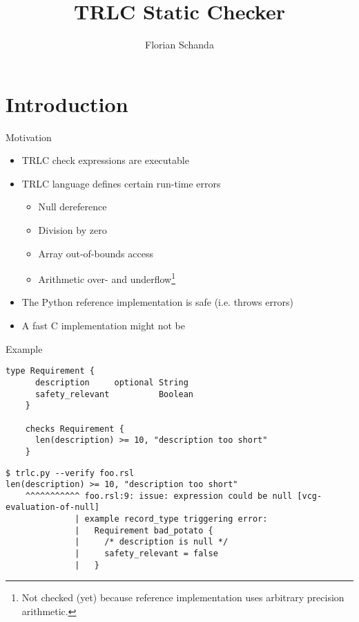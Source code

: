 \documentclass[aspectratio=169]{beamer}
\author{Florian Schanda}
\title{TRLC Static Checker}
\begin{document}
\maketitle

\section{Introduction}
\begin{frame}{Motivation}
  \begin{itemize}
  \item TRLC check expressions are executable
  \item TRLC language defines certain run-time errors
    \begin{itemize}
    \item Null dereference
    \item Division by zero
    \item Array out-of-bounds access
    \item Arithmetic over- and underflow\footnote{Not checked (yet)
        because reference implementation uses arbitrary precision
        arithmetic.}
    \end{itemize}
  \item The Python reference implementation is safe (i.e. throws errors)
  \item A fast C implementation might not be
  \end{itemize}
\end{frame}

\begin{frame}[fragile]{Example}
  \begin{lstlisting}[language=TRLC,gobble=4]
    type Requirement {
      description     optional String
      safety_relevant          Boolean
    }

    checks Requirement {
      len(description) >= 10, "description too short"
    }
  \end{lstlisting}
  \pause
  \begin{scriptsize}
\begin{verbatim}
$ trlc.py --verify foo.rsl
len(description) >= 10, "description too short"
    ^^^^^^^^^^^ foo.rsl:9: issue: expression could be null [vcg-evaluation-of-null]
              | example record_type triggering error:
              |   Requirement bad_potato {
              |     /* description is null */
              |     safety_relevant = false
              |   }
\end{verbatim}
  \end{scriptsize}
\end{frame}
\end{document}
